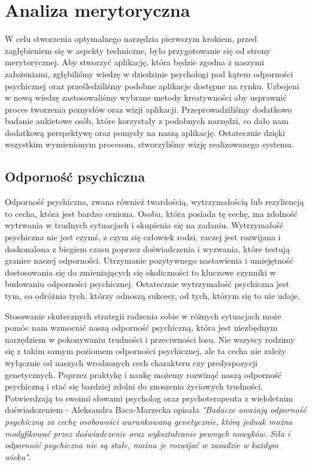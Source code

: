 \chapter{Analiza merytoryczna}
W celu stworzenia optymalnego narzędzia pierwszym krokiem, przed zagłębieniem
się w aspekty techniczne, było przygotowanie się od strony merytorycznej. Aby
stworzyć aplikację, która będzie zgodna z naszymi założeniami, zgłębiliśmy
wiedzę w dziedzinie psychologi pod kątem odporności psychicznej oraz
prześledziliśmy podobne aplikacje dostępne na rynku. Uzbojeni w nową wiedzę
zastosowaliśmy wybrane metody kreatywności aby usprawnić proces tworzenia
pomysłów oraz wizji aplikacji. Przeprowadziliśmy dodatkowo badanie ankietowe
osób, które korzystały z podobnych narzędzi, co dało nam dodatkową perspektywę
oraz pomysły na naszą aplikację. Ostatecznie dzięki wszystkim wymienionym
procesom, stworzyliśmy wizję realizowanego systemu.
\section{Odporność psychiczna}
Odporność psychiczna, zwana również twardością, wytrzymałością lub rezyliencją
to cecha, która jest bardzo ceniona. Osoba, która posiada tę cechę, ma zdolność
wytrwania w trudnych sytuacjach i skupienia się na zadaniu. Wytrzymałość
psychiczna nie jest czymś, z czym się człowiek rodzi, raczej jest rozwijana i
doskonalona z biegiem czasu poprzez doświadczenia i wyzwania, które testują
granice naszej odporności. Utrzymanie pozytywnego nastawienia i umiejętność
dostosowania się do zmieniających się okoliczności to kluczowe czynniki w
budowaniu odporności psychicznej. Ostatecznie wytrzymałość psychiczna jest tym,
co odróżnia tych, którzy odnoszą sukcesy, od tych, którym się to nie udaje.

Stosowanie skutecznych strategii radzenia sobie w różnych sytuacjach może pomóc
nam wzmocnić naszą odporność psychiczną, która jest niezbędnym narzędziem w
pokonywaniu trudności i przeciwności losu. Nie wszyscy rodzimy się z takim samym
poziomem odporności psychicznej, ale ta cecha nie zależy wyłącznie od naszych
wrodzonych cech charakteru czy predyspozycji genetycznych. Poprzez praktykę i
naukę możemy rozwinąć naszą odporność psychiczną i stać się bardziej zdolni do
znoszenia życiowych trudności. Potwierdzają to swoimi słowami psycholog oraz
psychoterapeuta z wieloletnim doświadczeniem - Aleksandra Baca-Marzecka opisała
\textit{"Badacze uważają odporność psychiczną za cechę osobowości warunkowaną
genetycznie, którą jednak można modyfikować przez doświadczenie oraz
wykształcanie pewnych nawyków. Siła i odporność psychiczna nie są stałe, można
je rozwijać w zasadzie w każdym wieku"}\cite{Rymkiewicz}.

